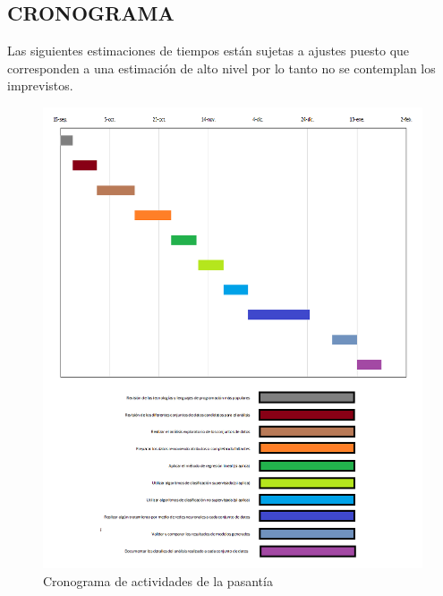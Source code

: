 \begin{center}
\section{CRONOGRAMA}
\end{center}

\noindent Las siguientes estimaciones de tiempos est\'an sujetas a ajustes puesto que corresponden a una estimaci\'on de alto nivel por lo tanto no se contemplan los imprevistos.
\\
\begin{figure}[h]
	\centering
	\includegraphics[scale=0.47]{figs/cronograma}
	\caption{Cronograma de actividades de la pasant\'ia} 
	\label{fig:cronograma}
\end{figure}

